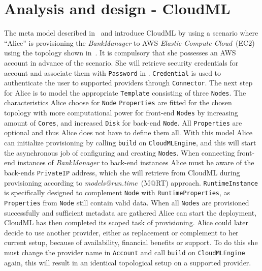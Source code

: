 \chapter{Analysis and design - CloudML}



The meta model described in~ and introduce CloudML by
using a scenario where ``Alice'' is provisioning the \emph{BankManager} to AWS \emph{Elastic Compute Cloud}~(EC2)
using the topology shown in~.
It is compulsory that she possesses an AWS account in advance of the scenario.
She will retrieve security credentials for account 
and associate them with \texttt{Password} in .
\texttt{Credential} is used to authenticate the user to supported providers through \texttt{Connector}.
The next step for Alice is to model the appropriate \texttt{Template} consisting
of three \texttt{Nodes}.
The characteristics Alice choose for \texttt{Node} \texttt{Properties} are fitted
for the chosen topology with more computational power for front-end \texttt{Nodes}
by increasing amount of \texttt{Cores}, and increased \texttt{Disk} for back-end \texttt{Node}.
All \texttt{Properties} are optional and thus Alice does not have to define them all.
With this model Alice can initialize provisioning by calling \texttt{build} on \texttt{CloudMLEngine},
and this will start the asynchronous job of configuring and creating \texttt{Nodes}.
When connecting front-end instances of \emph{BankManager} to back-end instances Alice must 
be aware of the back-ends \texttt{PrivateIP} address, which she will retrieve from CloudML
during provisioning according to \emph{models@run.time}~(M@RT) approach.
\texttt{RuntimeInstance} is specifically designed to complement \texttt{Node} with \texttt{RuntimeProperties},
as \texttt{Properties} from \texttt{Node} still contain valid data.
When all \texttt{Nodes} are provisioned successfully and sufficient metadata are gathered
Alice can start the deployment, CloudML has then completed its scoped task of provisioning.
Alice could later decide to use another provider, either as replacement or complement to her current setup,
because of availability, financial benefits  or support.
To do this she must change the provider name in \texttt{Account} and call \texttt{build} on \texttt{CloudMLEngine} again,
this will result in an identical topological setup on a supported provider.

